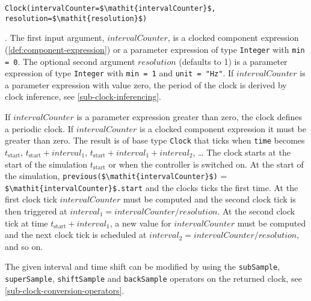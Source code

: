 \begin{operatordefinition*}[Clock]\label{modelica:clock-rational}
\begin{synopsis}\begin{lstlisting}
Clock(intervalCounter=$\mathit{intervalCounter}$, resolution=$\mathit{resolution}$)
\end{lstlisting}\end{synopsis}
\begin{semantics}
.
The first input argument, $\mathit{intervalCounter}$, is a clocked component expression (\cref{def:component-expression}) or a parameter expression of type \lstinline!Integer! with \lstinline!min = 0!.
The optional second argument $\mathit{resolution}$ (defaults to 1) is a parameter expression of type \lstinline!Integer! with \lstinline!min = 1! and \lstinline!unit = "Hz"!.
If $\mathit{intervalCounter}$ is a parameter expression with value zero, the period of the clock is derived by clock inference, see \cref{sub-clock-inferencing}.

If $\mathit{intervalCounter}$ is a parameter expression greater than zero, the clock defines a periodic clock.
If $\mathit{intervalCounter}$ is a clocked component expression it must be greater than zero.
The result is of base type \lstinline!Clock! that ticks when \lstinline!time! becomes $t_{\mathrm{start}}$, $t_{\mathrm{start}} + \mathit{interval}_{1}$, $t_{\mathrm{start}} + \mathit{interval}_{1} + \mathit{interval}_{2}$, \@\ldots{}
The clock starts at the start of the simulation $t_{\mathrm{start}}$ or when the controller is switched on.
At the start of the simulation, \lstinline!previous($\mathit{intervalCounter}$)! = \lstinline!$\mathit{intervalCounter}$.start! and the clocks ticks the first time.
At the first clock tick $\mathit{intervalCounter}$ must be computed and the second clock tick is then triggered at $\mathit{interval}_{1} = \mathit{intervalCounter}/\mathit{resolution}$.
At the second clock tick at time $t_{\mathrm{start}} + \mathit{interval}_{1}$, a new value for $\mathit{intervalCounter}$ must be computed and the next clock tick is scheduled at $\mathit{interval}_{2} = \mathit{intervalCounter}/\mathit{resolution}$, and so on.


\begin{nonnormative}
The given interval and time shift %
can be modified by using the \lstinline!subSample!, \lstinline!superSample!, \lstinline!shiftSample! and \lstinline!backSample! operators on the returned clock, see \cref{sub-clock-conversion-operators}.
\end{nonnormative}


\end{semantics}
\end{operatordefinition*}
